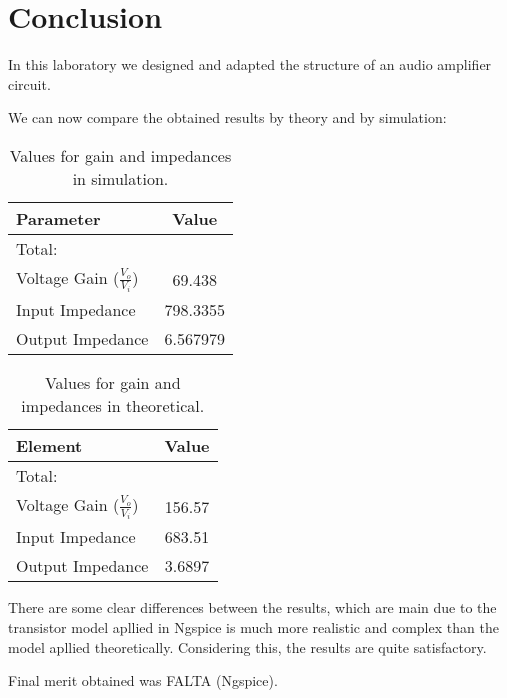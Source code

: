 \newpage
\section{Conclusion}
\label{sec:conclusion}

In this laboratory we designed and adapted the structure of an audio amplifier circuit.

We can now compare the obtained results by theory and by simulation:

\begin{table}[h]
    \centering
    \begin{tabular}{|l|c|}
    \hline
    {\bf Parameter} & {\bf Value} \\ 
    \hline\hline
    Total: & \\ \hline
     Voltage Gain ($\frac{V_{o}}{V_{i}}$)  & 69.438 \\ \hline
    Input Impedance & 798.3355 \\ \hline
    Output Impedance  & 6.567979  \\ \hline
    \end{tabular}
    \caption{Values for gain and impedances in simulation.}
    \label{tab:values}
\end{table}

\begin{table}[h]
    \centering
    \begin{tabular}{|l|c|}
    \hline
    {\bf Element } & {\bf Value} \\
    \hline \hline
    Total: & \\ \hline
     Voltage Gain ($\frac{V_{o}}{V_{i}}$)  & 156.57\\ \hline
    Input Impedance & 683.51 \\ \hline
    Output Impedance  & 3.6897 \\ \hline
    \end{tabular}
    \caption{Values for gain and impedances in theoretical.}
    \label{tab:sim1}
\end{table}

There are some clear differences between the results, which are main due to the transistor model apllied in Ngspice is much more realistic and complex than the model apllied theoretically. Considering this, the results are quite satisfactory.

Final merit obtained was FALTA (Ngspice). 
